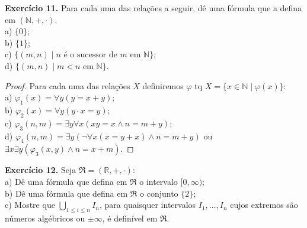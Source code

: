 \documentclass[11pt]{article}
\newcommand{\mf}[1]{\mathfrak{#1}}
\newcommand{\mbb}[1]{\mathbb{#1}}
\begin{document}
\begin{shaded}
\textbf{Exercício 11.} Para cada uma das relações a seguir, dê uma fórmula que a defina em $(\mbb{N},+,\cdot)$.\\
a) $\{0\}$;\\
b) $\{1\}$;\\
c) $\{(m,n)\mid n\text{ é o sucessor de }m\text{ em }\mbb{N}\}$;\\
d) $\{(m,n)\mid m<n\text{ em }\mbb{N}\}$.
\end{shaded}

\begin{proof}
    Para cada uma das relações $X$ definiremos $\varphi$ tq $X=\{x\in\mbb{N}\mid\varphi(x)\}$:\\
    a) $\varphi_1(x)=\forall y(y=x+y)$;\\
    b) $\varphi_2(x)=\forall y(y\cdot x=y)$;\\
    c) $\varphi_3(n,m)=\exists y\forall x(xy=x\wedge n=m+y)$;\\
    d) $\varphi_4(n,m)=\exists y(\neg\forall x(x=y+x)\wedge n=m+y)$ ou $\exists x\exists y(\varphi_3(x,y)\wedge n=x+m)$.
\end{proof}

\begin{shaded}
\textbf{Exercício 12.} Seja $\mf{R}=(\mbb{R},+,\cdot)$:\\
a) Dê uma fórmula que defina em $\mf{R}$ o intervalo $[0,\infty)$;\\
b) Dê uma fórmula que defina em $\mf{R}$ o conjunto $\{2\}$;\\
c) Mostre que $\bigcup_{1\leq i\leq n}I_n$, para quaisquer intervalos $I_1,\dots,I_n$ cujos extremos são números algébricos ou $\pm\infty$, é definível em $\mf{R}$.
\end{shaded}
\end{document}
